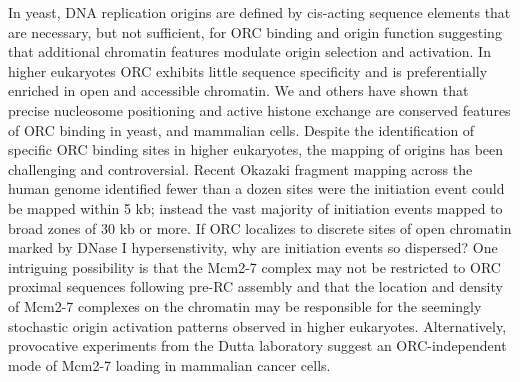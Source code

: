 In yeast, DNA replication origins are defined by cis-acting sequence elements that are necessary, but not sufficient, for ORC binding and origin function\citep{Breier2004-tw} suggesting that additional chromatin features modulate origin selection and activation.  In higher eukaryotes ORC exhibits little sequence specificity\citep{Vashee2003-xr} and is preferentially enriched in open and accessible chromatin\citep{MacAlpine2010-ju,Miotto2016-jt}.   We and others have shown that precise nucleosome positioning and active histone exchange are conserved features of ORC binding in yeast\citep{Eaton2010-fq,Berbenetz2010-hh}, \dros\citep{Liu2015-nr,MacAlpine2010-wz} and mammalian cells\citep{Lombrana2013-aw,Lubelsky2011-dj}.  Despite the identification of specific ORC binding sites in higher eukaryotes\citep{Miotto2016-jt}, the mapping of origins has been challenging and controversial\citep{Prioleau2016-bj}.  Recent Okazaki fragment mapping across the human genome identified fewer than a dozen sites were the initiation event could be mapped within 5 kb; instead the vast majority of initiation events mapped to broad zones of 30 kb or more\citep{Petryk2016-rr}.  If ORC localizes to discrete sites of open chromatin marked by DNase I hypersenstivity\citep{MacAlpine2010-ju,Miotto2016-jt}, why are initiation events so dispersed?  One intriguing possibility is that the Mcm2-7 complex may not be restricted to ORC proximal sequences following pre-RC assembly and that the location and density of Mcm2-7 complexes on the chromatin may be responsible for the seemingly stochastic origin activation patterns observed in higher eukaryotes. Alternatively, provocative experiments from the Dutta laboratory  suggest an ORC-independent mode of Mcm2-7 loading in mammalian cancer cells\citep{Shibata2016-uc}. 


